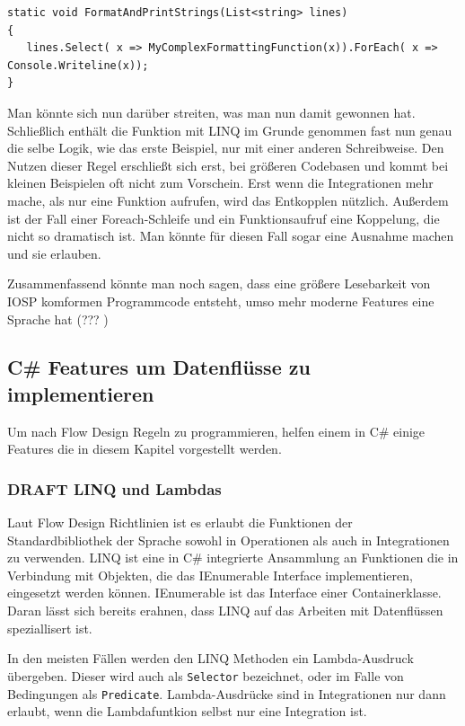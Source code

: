 \documentclass[11pt]{article}
\begin{document}
\begin{verbatim}
static void FormatAndPrintStrings(List<string> lines)
{
   lines.Select( x => MyComplexFormattingFunction(x)).ForEach( x => Console.Writeline(x));
}
\end{verbatim}
Man könnte sich nun darüber streiten, was man nun damit gewonnen hat. Schließlich enthält die Funktion mit LINQ im Grunde
genommen fast nun genau die selbe Logik, wie das erste Beispiel, nur mit einer anderen Schreibweise.
Den Nutzen dieser Regel erschließt sich erst, bei größeren Codebasen und kommt bei kleinen Beispielen oft nicht zum Vorschein.
Erst wenn die Integrationen mehr mache, als nur eine Funktion aufrufen, wird das Entkopplen nützlich.
Außerdem ist der Fall einer Foreach-Schleife und ein Funktionsaufruf eine Koppelung, die nicht so dramatisch ist. Man
könnte für diesen Fall sogar eine Ausnahme machen und sie erlauben.


Zusammenfassend könnte man noch sagen, dass eine größere Lesebarkeit von IOSP komformen Programmcode entsteht, umso mehr moderne
Features eine Sprache hat (??? )
\subsection{C\# Features um Datenflüsse zu implementieren}
\label{sec:orgheadline47}
Um nach Flow Design Regeln zu programmieren, helfen einem in C\# einige Features die in diesem Kapitel vorgestellt werden.

\subsubsection{{\bfseries\sffamily DRAFT} LINQ und Lambdas}
\label{sec:orgheadline43}
Laut Flow Design Richtlinien ist es erlaubt die Funktionen der
Standardbibliothek der Sprache sowohl in Operationen als auch in Integrationen
zu verwenden. LINQ ist eine in C\# integrierte Ansammlung an Funktionen die in Verbindung mit
Objekten, die das IEnumerable Interface implementieren, eingesetzt werden
können.
IEnumerable ist das Interface einer Containerklasse. Daran lässt sich bereits erahnen, dass LINQ
auf das Arbeiten mit Datenflüssen speziallisert ist.

In den meisten Fällen werden den LINQ Methoden ein Lambda-Ausdruck übergeben. 
Dieser wird auch als \texttt{Selector} bezeichnet, oder im Falle von Bedingungen als \texttt{Predicate}.
Lambda-Ausdrücke sind in Integrationen nur dann erlaubt, wenn die Lambdafuntkion
selbst nur eine Integration ist.
\end{document}

